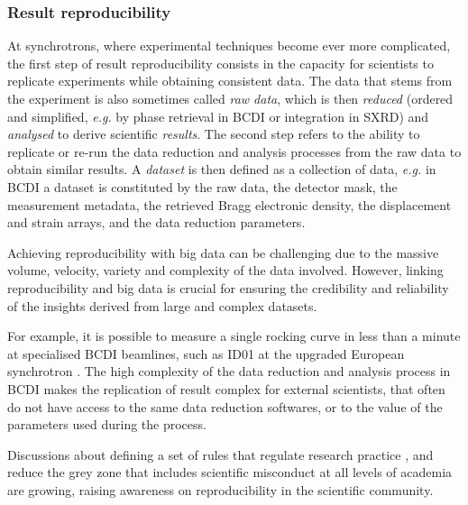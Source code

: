 
\subsubsection{Result reproducibility}

At synchrotrons, where experimental techniques become ever more complicated, the first step of result reproducibility consists in the capacity for scientists to replicate experiments while obtaining consistent data.
The data that stems from the experiment is also sometimes called \textit{raw data}, which is then \textit{reduced} (ordered and simplified, \textit{e.g.} by phase retrieval in BCDI or integration in SXRD) and \textit{analysed} to derive scientific \textit{results}.
The second step refers to the ability to replicate or re-run the data reduction and analysis processes from the raw data to obtain similar results.
A \textit{dataset} is then defined as a collection of data, \textit{e.g.} in BCDI a dataset is constituted by the raw data, the detector mask, the measurement metadata, the retrieved Bragg electronic density, the displacement and strain arrays, and the data reduction parameters.

Achieving reproducibility with big data can be challenging due to the massive volume, velocity, variety and complexity of the data involved.
However, linking reproducibility and big data is crucial for ensuring the credibility and reliability of the insights derived from large and complex datasets.

For example, it is possible to measure a single rocking curve in less than a minute at specialised BCDI beamlines, such as ID01 at the upgraded European synchrotron \parencite{Leake2019}.
The high complexity of the data reduction and analysis process in BCDI makes the replication of result complex for external scientists, that often do not have access to the same data reduction softwares, or to the value of the parameters used during the process.

Discussions about defining a set of rules that regulate research practice \parencite{Kretser2019}, and reduce the grey zone that includes scientific misconduct at all levels of academia \parencite{Kornfeld2016} are growing, raising awareness on reproducibility in the scientific community.

